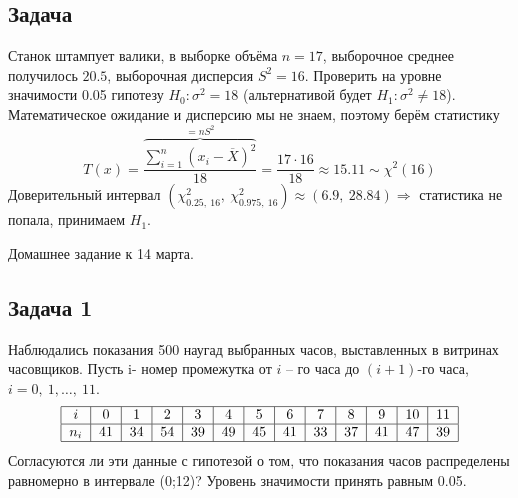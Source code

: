 \documentclass[12pt, a4paper]{article}
\begin{document}
\subsection*{Задача}
Станок штампует валики, в выборке объёма $n = 17$, выборочное среднее получилось $20.5$, выборочная дисперсия $S^2 = 16$. Проверить на уровне значимости 0.05 гипотезу $H_0: \sigma^2 = 18$ (альтернативой будет $H_1: \sigma^2 \neq 18$).\\
Математическое ожидание и дисперсию мы не знаем, поэтому берём статистику
\[T(x) = \frac{\overset{=nS^2}{\overbrace{\sum_{i = 1}^{n}\left( x_i - \overline{X} \right)^2}}}{18} = \frac{17\cdot 16}{18}\approx 15.11 \sim \chi^2(16)\]
Доверительный интервал $(\chi^2_{0.25,\ 16},\ \chi^2_{0.975,\ 16}) \approx (6.9,\ 28.84)\Rightarrow$ статистика не попала, принимаем $H_1$.
\begin{center}
    Домашнее задание к 14 марта.
\end{center}
\subsection*{Задача 1}
Наблюдались показания 500 наугад выбранных часов, выставленных в витринах  часовщиков. Пусть i- номер промежутка от $i$ – го часа до $(i+1)$-го часа, $i= 0,\ 1,\dots,\ 11$.
\[\begin{tabular}{|c|c|c|c|c|c|c|c|c|c|c|c|c|}
        \hline
        $i$   & 0  & 1  & 2  & 3  & 4  & 5  & 6  & 7  & 8  & 9  & 10 & 11 \\
        \hline
        $n_i$ & 41 & 34 & 54 & 39 & 49 & 45 & 41 & 33 & 37 & 41 & 47 & 39 \\
        \hline
    \end{tabular}\]
Согласуются ли эти данные с гипотезой о том, что показания часов распределены равномерно в интервале (0;12)? Уровень значимости принять равным 0.05.
\end{document}
